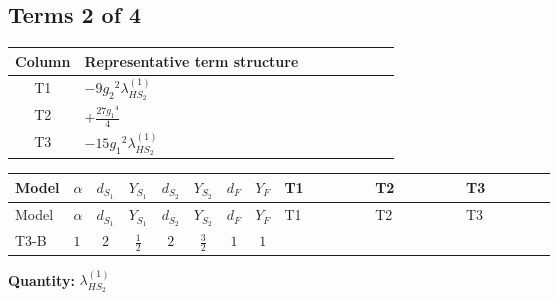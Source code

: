 \documentclass[8pt]{article}
\begin{document}
\begin{landscape}
\subsection*{Terms 2 of 4}
\begin{center}
\begin{tabular}{@{}c >{\raggedright\arraybackslash}p{0.82\linewidth}@{}}
\toprule
Column & Representative term structure \\
\midrule
T1 & \(\displaystyle -9 {g_2}^2 {\lambda_{HS_2}^{(1)}}\) \\
\midrule
T2 & \(\displaystyle +\frac{27 {g_1}^4}{4}\) \\
\midrule
T3 & \(\displaystyle -15 {g_1}^2 {\lambda_{HS_2}^{(1)}}\) \\
\midrule
\bottomrule
\end{tabular}
\end{center}
\smallskip
\tiny
\begin{longtable}{@{}llcccccc >{\raggedright\arraybackslash}p{0.21\linewidth} >{\raggedright\arraybackslash}p{0.21\linewidth} >{\raggedright\arraybackslash}p{0.21\linewidth}@{}}
\toprule
Model & $\alpha$ & $d_{S_1}$ & $Y_{S_1}$ & $d_{S_2}$ & $Y_{S_2}$ & $d_F$ & $Y_F$ & T1 & T2 & T3 \\
\midrule
\endfirsthead
\toprule
Model & $\alpha$ & $d_{S_1}$ & $Y_{S_1}$ & $d_{S_2}$ & $Y_{S_2}$ & $d_F$ & $Y_F$ & T1 & T2 & T3 \\
\midrule
\endhead
T3-B & $1$ & $2$ & $\frac{1}{2}$ & $2$ & $\frac{3}{2}$ & $1$ & $1$ & \scriptsize\adjustbox{max width=\linewidth}{$\begin{gathered} -9 {g_2}^2 {\lambda_{HS_2}^{(1)}}\end{gathered}$} & \scriptsize\adjustbox{max width=\linewidth}{$\begin{gathered} +\frac{27 {g_1}^4}{4}\end{gathered}$} & \scriptsize\adjustbox{max width=\linewidth}{$\begin{gathered} -15 {g_1}^2 {\lambda_{HS_2}^{(1)}}\end{gathered}$} \\
\midrule
\bottomrule
\end{longtable}
\clearpage
\noindent\textbf{Quantity: }$\lambda_{HS_2}^{(1)}$\par\smallskip

\end{landscape}
\end{document}
